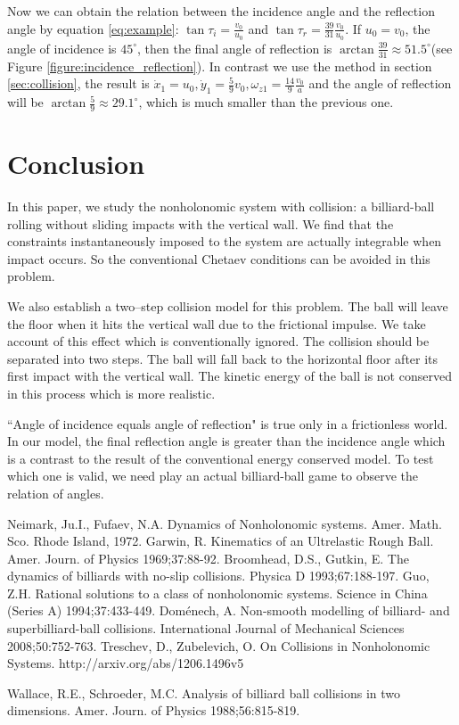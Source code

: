 \documentclass[preprint,12pt]{elsarticle}
\begin{document}
Now we can obtain the relation between the incidence angle and the reflection angle by equation \eqref{eq:example}: $\tan\tau_{i}=\frac{v_0}{u_0}$ and $\tan\tau_{r}=\frac{39}{31}\frac{v_0}{u_0}$.
If $u_0=v_0$, the angle of incidence is $45^{\circ}$, then the final angle of reflection is $\arctan\frac{39}{31}\approx51.5^{\circ}$(see Figure \ref{figure:incidence_reflection}).
In contrast we use the method in section \ref{sec:collision}, the result is $\dot{x}_1=u_0, \dot{y}_1=\frac{5}{9}v_0, \omega_{z1}=\frac{14}{9}\frac{v_0}{a}$ and the angle of reflection will be $\arctan\frac{5}{9}\approx29.1^{\circ}$, which is much smaller than the previous one.

\section{Conclusion}

In this paper, we study the nonholonomic system with collision: a billiard-ball rolling without sliding impacts with the vertical wall. We find that the constraints instantaneously imposed to the system are actually integrable when impact occurs. So the conventional Chetaev conditions can be avoided in this problem.

We also establish a two--step collision model for this problem. The ball will leave the floor when it hits the vertical wall due to the frictional impulse. We take account of this effect which is conventionally ignored. The collision should be separated into two steps. The ball will fall back to the horizontal floor after its first impact with the vertical wall. The kinetic energy of the ball is not conserved in this process which is more realistic.

``Angle of incidence equals angle of reflection" is true only in a frictionless world\cite{Wallace}. In our model, the final reflection angle is greater than the incidence angle which is a contrast to the result of the conventional energy conserved model. To test which one is valid, we need play an actual billiard-ball game to observe the relation of angles.


\begin{thebibliography}{99}
\setlength{\parskip}{0pt}  %
 Neimark, Ju.I., Fufaev, N.A. Dynamics of Nonholonomic systems. Amer. Math. Sco. Rhode Island, 1972.
 Garwin, R. Kinematics of an Ultrelastic Rough Ball. Amer. Journ. of Physics 1969;37:88-92.
 Broomhead, D.S., Gutkin, E. The dynamics of billiards with no-slip collisions. Physica D 1993;67:188-197.
 Guo, Z.H. Rational solutions to a class of nonholonomic systems. Science in China (Series A) 1994;37:433-449.
 Dom\'enech, A. Non-smooth modelling of billiard- and superbilliard-ball collisions. International Journal of Mechanical Sciences 2008;50:752-763.
 Treschev, D., Zubelevich, O. On Collisions in Nonholonomic Systems. http://arxiv.org/abs/1206.1496v5

 Wallace, R.E., Schroeder, M.C. Analysis of billiard ball collisions in two dimensions. Amer. Journ. of Physics 1988;56:815-819.
\end{thebibliography}
\end{document}
